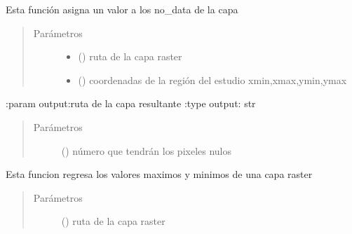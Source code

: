 \documentclass[letterpaper,10pt,spanish]{sphinxmanual}
\begin{document}
\begin{fulllineitems}
\label{\detokenize{apcsig:apcsig.nulls}}
Esta función asigna un valor  a los no\_data de la capa
\begin{quote}\begin{description}
\item[{Parámetros}] \leavevmode\begin{itemize}
\item {} 
 () \textendash{} ruta de la capa raster

\item {} 
 () \textendash{} coordenadas de la región del estudio  xmin,xmax,ymin,ymax

\end{itemize}

\end{description}\end{quote}

:param output:ruta de la capa resultante
:type output: str
\begin{quote}\begin{description}
\item[{Parámetros}] \leavevmode
{} () \textendash{} número que tendrán los pixeles nulos

\end{description}\end{quote}

\end{fulllineitems}


\begin{fulllineitems}
\label{\detokenize{apcsig:apcsig.raster_min_max}}
Esta funcion regresa los valores maximos y minimos de una capa raster
\begin{quote}\begin{description}
\item[{Parámetros}] \leavevmode
{} () \textendash{} ruta de la capa raster

\end{description}\end{quote}

\end{fulllineitems}
\end{document}
